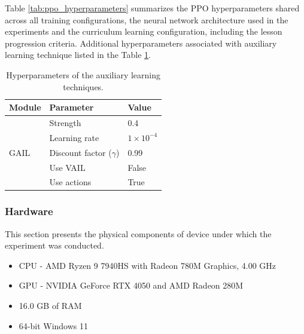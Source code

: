 Table \ref{tab:ppo_hyperparameters} summarizes the PPO hyperparameters shared across all training configurations, the neural network architecture used in the experiments and the curriculum learning configuration, including the lesson progression criteria.
Additional hyperparameters associated with auxiliary learning technique listed in the Table \ref{tab:auxiliary}.
\begin{table}[H]
	\centering
	\caption{Hyperparameters of the auxiliary learning techniques.}
	\label{tab:auxiliary}
	\begin{tabular}{lll}
		\toprule
		\textbf{Module} & \textbf{Parameter} & \textbf{Value} \\
		\midrule
		\multirow{5}{*}{GAIL}
		& Strength & 0.4 \\
		& Learning rate & $1\times10^{-4}$ \\
		& Discount factor ($\gamma$) & 0.99 \\
		& Use VAIL & False \\
		& Use actions & True \\
		\bottomrule
	\end{tabular}
\end{table}

\subsubsection{Hardware}
This section presents the physical components of device under which the experiment was conducted. 
\begin{itemize}
	\item CPU - AMD Ryzen 9 7940HS with Radeon 780M Graphics, 4.00 GHz
	\item GPU - NVIDIA GeForce RTX 4050 and AMD Radeon 280M
	\item 16.0 GB of RAM
	\item 64-bit Windows 11
\end{itemize}
%
%
%
%
%
%
